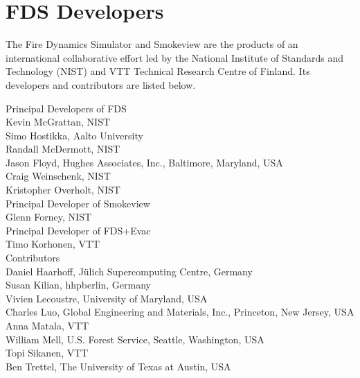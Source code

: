 \chapter{FDS Developers}

The Fire Dynamics Simulator and Smokeview are the products of an international collaborative effort led by
the National Institute of Standards and Technology (NIST) and VTT Technical Research Centre of Finland. Its developers and
contributors are listed below.

\vspace{0.3in}

\begin{flushleft}

Principal Developers of FDS  \\ [0.2in]

Kevin McGrattan, NIST \\
Simo Hostikka, Aalto University \\
Randall McDermott, NIST \\
Jason Floyd, Hughes Associates, Inc., Baltimore, Maryland, USA \\
Craig Weinschenk, NIST \\
Kristopher Overholt, NIST \\ [0.3in]

Principal Developer of Smokeview  \\ [0.2in]

Glenn Forney, NIST \\ [0.3in]

Principal Developer of FDS+Evac  \\ [0.2in]

Timo Korhonen, VTT \\ [0.3in]

Contributors \\ [0.2in]

Daniel Haarhoff, J\"ulich Supercomputing Centre, Germany \\
Susan Kilian, hhpberlin, Germany \\
Vivien Lecoustre, University of Maryland, USA \\
Charles Luo, Global Engineering and Materials, Inc., Princeton, New Jersey, USA \\
Anna Matala, VTT \\
William Mell, U.S. Forest Service, Seattle, Washington, USA \\
Topi Sikanen, VTT \\
Ben Trettel, The University of Texas at Austin, USA

\end{flushleft}


